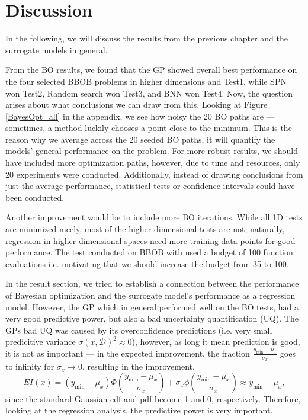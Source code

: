 \chapter{Discussion}
In the following, we will discuss the results from the previous chapter and the
surrogate models in general. 

From the BO results, we found that the GP showed overall best performance on the four selected BBOB
problems in higher dimensions and Test1, while SPN won Test2, Random search won Test3, and BNN won
Test4. Now, the question arises about what conclusions we can draw from this. Looking at Figure
\ref{BayesOpt_all} in the appendix, we see how noisy the 20 BO paths are --- sometimes, a method
luckily chooses a point close to the minimum. This is the reason why we average across the 20 seeded
BO paths, it will quantify the models' general performance on the problem. For more robust results,
we should have included more optimization paths, however, due to time and resources, only 20
experiments were conducted. Additionally, instead of drawing conclusions from just the average
performance, statistical tests or confidence intervals could have been conducted. 

Another improvement would be to include more BO iterations. While all 1D
tests are minimized nicely, most of the higher dimensional tests are not; naturally, regression in
higher-dimensional spaces need more training data points for good performance. The test conducted on
BBOB with \cite{PhDthesis} used a budget of 100 function evaluations i.e. motivating that we should
increase the budget from 35 to 100.

In the result section, we tried to establish a connection between the performance of Bayesian
optimization and the surrogate model's performance as a regression model. However, the GP which in
general performed well on the BO tests, had a very good predictive power, but also a bad uncertainty
quantification (UQ). The GPs bad UQ was caused by its overconfidence predictions (i.e. very
small predicitive variance $\sigma(x,\mathcal{D})^2 \approx 0$), however, as long it mean
prediction is good, it is not as important --- in the expected improvement, the fraction
$\frac{y_{\min}-\mu_x}{\sigma_x}$ goes to infinity for $\sigma_x \rightarrow 0$, resulting in the
improvement, 
$$EI(x) = (y_{\min}-\mu_x)\Phi\left(\frac{y_{\min}-\mu_x}{\sigma_x}\right)+ \sigma_x
\phi\left(\frac{y_{\min}-\mu_x}{\sigma_x}\right) \approx y_{\min}-\mu_x,$$ since the standard
Gaussian cdf and pdf become 1 and 0, respectively. Therefore, looking at the regression analysis, 
the predictive power is very important. 

